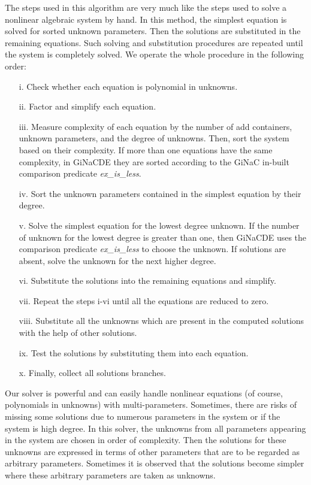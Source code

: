 \documentclass[prd,aps,floats,showkeys,nofootinbib,notitlepage]{revtex4}
\begin{document}
	The steps used in this algorithm are very much like the steps used to solve a nonlinear algebraic system by hand. In this method, the simplest equation is solved for sorted unknown parameters. Then the solutions are substituted in the remaining equations. Such solving and substitution procedures are repeated until the system is completely solved. We operate the whole procedure in the following order:
	\begin{itemize}
		\item[i.] Check whether each equation is polynomial in unknowns.
		\item[ii.] Factor and simplify each equation.
		\item[iii.] Measure complexity of each equation by the number of add containers, unknown parameters, and the degree of unknowns. Then, sort the system based on their complexity. If more than one equations have the same complexity, in GiNaCDE they are sorted according to the GiNaC in-built comparison predicate {\em ex\_is\_less}.
		\item[iv.] Sort the unknown parameters contained in the simplest equation by their degree.
		\item[v.] Solve the simplest equation for the lowest degree unknown. If the number of unknown for the lowest degree is greater than one, then GiNaCDE uses the comparison predicate {\em ex\_is\_less} to choose the unknown. If solutions are absent, solve the unknown for the next higher degree. 
		\item[vi.] Substitute the solutions into the remaining equations and simplify.
		\item[vii.] Repeat the steps i-vi until all the equations are reduced to zero.
		\item[viii.] Substitute all the unknowns which are present in the computed solutions with the help of other solutions.
		\item[ix.] Test the solutions by substituting them into each equation.
		\item[x.] Finally, collect all solutions branches.
	\end{itemize}
	Our solver is powerful and can easily handle nonlinear equations (of course, polynomials in unknowns) with multi-parameters. Sometimes, there are risks of missing some solutions due to numerous parameters in the system or if the system is high degree. In this solver, the unknowns from all parameters appearing in the system are chosen in order of complexity. Then the solutions for these unknowns are expressed in terms of other parameters that are to be regarded as arbitrary parameters. Sometimes it is observed that the solutions become simpler where these arbitrary parameters are taken as unknowns.\\
	
\end{document}
